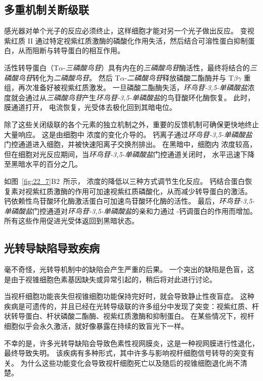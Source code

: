 \subsection{多重机制关断级联}

感光器对单个光子的反应必须终止，这样细胞才能对另一个光子做出反应。
变视紫红质 II 通过特定视紫红质激酶的磷酸化作用失活，然后结合可溶性蛋白抑制蛋白，从而阻断与转导蛋白的相互作用。


活性转导蛋白（T$\alpha$-\textit{三磷酸鸟苷}）具有内在的\textit{三磷酸鸟苷}酶活性，最终将结合的\textit{三磷酸鸟苷}转化为\textit{二磷酸鸟苷}。
然后 T$\alpha$-\textit{二磷酸鸟苷}释放磷酸二酯酶并与 T$\beta$$\gamma$ 重组，再次准备好被视紫红质激发。
一旦磷酸二酯酶失活，\textit{环鸟苷-3,5-单磷酸盐}浓度就会通过从\textit{三磷酸鸟苷}产生\textit{环鸟苷-3,5-单磷酸盐}的鸟苷酸环化酶恢复。
此时，膜通道打开， 电流恢复，光受体去极化回到其暗电位。


除了这些关闭级联的各个元素的独立机制之外，重要的反馈机制可确保更快地终止大量响应。
这是由细胞中  浓度的变化介导的。
钙离子通过\textit{环鸟苷-3,5-单磷酸盐}门控通道进入细胞，并被快速阳离子交换剂排出。
在黑暗中，细胞内  浓度较高，但在细胞对光反应期间，当\textit{环鸟苷-3,5-单磷酸盐}门控通道关闭时， 水平迅速下降至黑暗水平的百分之几。


如图~\ref{fig:22_7}B2~所示， 浓度的降低以三种方式调节生化反应。
钙结合蛋白恢复素对视紫红质激酶的作用可加速视紫红质磷酸化，从而减少转导蛋白的激活。
钙依赖性鸟苷酸环化酶激活蛋白可加速鸟苷酸环化酶的活性。
最后，\textit{环鸟苷-3,5-单磷酸盐}门控通道对\textit{环鸟苷-3,5-单磷酸盐}的亲和力通过 -钙调蛋白的作用而增加。
所有这些作用促进光受体返回到黑暗状态。



\subsection{光转导缺陷导致疾病}

毫不奇怪，光转导机制中的缺陷会产生严重的后果。
一个突出的缺陷是色盲，这是由于视锥细胞色素基因缺失或异常引起的，稍后将对此进行讨论。


当视杆细胞功能丧失但视锥细胞功能保持完好时，就会导致静止性夜盲症。
这种疾病是可遗传的，并且已经在光转导级联的许多组分中发现了突变：视紫红质、杆状转导蛋白、杆状磷酸二酯酶、视紫红质激酶和抑制蛋白。
在某些情况下，视杆细胞似乎会永久激活，就好像暴露在持续的致盲光下一样。


不幸的是，许多光转导缺陷会导致色素性视网膜炎，这是一种视网膜进行性退化，最终导致失明。
该疾病有多种形式，其中许多与影响视杆细胞信号转导的突变有关。
为什么这些功能变化会导致视杆细胞死亡以及随后的视锥细胞退化尚不清楚。



